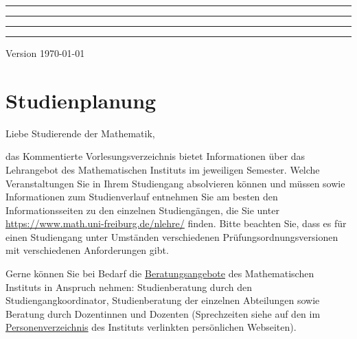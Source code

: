 \documentclass[a4paper,10pt]{article}
\begin{document}
\hrule\vskip1pt\hrule\medskip


\medskip
{}

\bigskip
{}

\medskip\hrule\vskip1pt\hrule

\bigskip
\bigskip


\hfill Version \today

\thispagestyle{empty}
\clearpage
\tableofcontents

\clearpage
{}





\section*{Studienplanung}

Liebe Studierende der Mathematik,

das Kommentierte Vorlesungsverzeichnis bietet Informationen über das Lehrangebot des Mathematischen Instituts im jeweiligen Semester.
Welche Veranstaltungen Sie in Ihrem Studiengang absolvieren können und müssen sowie Informationen zum Studienverlauf
entnehmen Sie am besten den Informationsseiten zu den einzelnen Studiengängen,
die Sie unter \url{https://www.math.uni-freiburg.de/nlehre/} finden. Bitte beachten Sie,
dass es für einen Studiengang unter Umständen verschiedenen Prüfungsordnungsversionen mit verschiedenen Anforderungen gibt.

Gerne können Sie bei Bedarf die \href{https://www.math.uni-freiburg.de/nlehre/de/studiendekanat/}{Beratungsangebote}
des Mathematischen Instituts in Anspruch nehmen: 
Studienberatung durch den Studiengangkoordinator, Studienberatung der einzelnen Abteilungen sowie
Beratung durch Dozentinnen und Dozenten
(Sprechzeiten siehe auf den im \href{https://home.mathematik.uni-freiburg.de/personen/list}{Personenverzeichnis} des Instituts
verlinkten persönlichen Webseiten).
\end{document}
